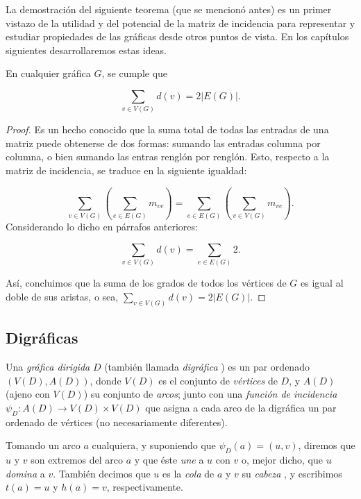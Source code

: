 La demostración del siguiente teorema (que se mencionó antes) es un primer vistazo de la utilidad y del potencial de la matriz de incidencia para representar y estudiar propiedades de las gráficas desde otros puntos de vista. En los capítulos siguientes desarrollaremos estas ideas.


\begin{teo}
En cualquier gráfica $G$, se cumple que

$$
\sum_{v \in V(G)} d(v) = 2 |E(G)|. 
$$
\end{teo}

\begin{proof}
Es un hecho conocido que la suma total de todas las entradas de una matriz puede obtenerse de dos formas: sumando las entradas columna por columna, o bien sumando las entras renglón por renglón. Esto, respecto a la matriz de incidencia, se traduce en la siguiente igualdad:

$$
\sum_{v \in V(G)} (\sum_{e \in E(G)} m_{ve}) = \sum_{e \in E(G)} (\sum_{v \in V(G)} m_{ve}).
$$
Considerando lo dicho en párrafos anteriores:

$$
\sum_{v \in V(G)} d(v) = \sum_{e \in E(G)} 2.
$$

Así, concluimos que la suma de los grados de todos los vértices de $G$ es igual al doble de sus aristas, o sea, $\sum_{v \in V(G)} d(v) = 2 |E(G)|$.

\end{proof}

\subsection{Digráficas} \label{sec:queesunadigrafica}

Una \textit{gráfica dirigida}  $D$ (también llamada \textit{digráfica} ) es un par ordenado $(V(D), A(D))$, donde $V(D)$ es el conjunto de \textit{vértices} de $D$, y $A(D)$ (ajeno con $V(D)$) su conjunto de \textit{arcos}; junto con una \textit{función de incidencia} 
 $\psi_D \colon A(D) \rightarrow V(D) \times V(D)$ que asigna a cada arco de la digráfica un par ordenado de vértices (no necesariamente diferentes).
 
 Tomando un arco $a$ cualquiera, y suponiendo que $\psi_D (a) = (u,v)$, diremos que $u$ y $v$ son extremos del arco $a$ y que éste \textit{une} a $u$ con $v$ o, mejor dicho, que $u$ \textit{domina} a $v$. También decimos que $u$ es la \textit{cola}  de $a$ y $v$ su \textit{cabeza }, y escribimos $t(a) = u$ y $h(a)=v$, respectivamente.
 
